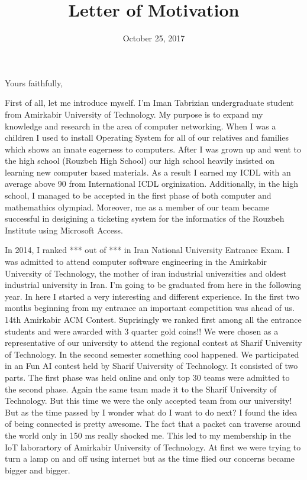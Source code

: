 \documentclass[11pt,a4paper,sans]{moderncv}        %
\title{Letter of Motivation}                               %
\begin{document}
\date{October 25, 2017}
\opening{}
\closing{Yours faithfully,}

\makelettertitle

First of all, let me introduce myself. I'm Iman Tabrizian undergraduate student
from Amirkabir University of Technology. My purpose is to expand my knowledge
and research in the area of computer networking. When I was a children I used
to install Operating System for all of our relatives and families which shows
an innate eagerness to computers. After I was grown up and went to the high school
(Rouzbeh High School) our high school heavily insisted on learning new
computer based materials. As a result I earned my ICDL with an average above 90
from International ICDL orginization. Additionally, in the high school, I
managed to be accepted in the first phase of both computer and mathemathics
olympiad. Moreover, me as a member of our team became successful in desigining
a ticketing system for the informatics of the Rouzbeh Institute using Microsoft
Access.

In 2014, I ranked *** out of *** in Iran National University Entrance Exam. I
was admitted to attend computer software engineering in the Amirkabir University
of Technology, the mother of iran industrial universities and oldest industrial
university in Iran. I'm going to be graduated from here in the following year.
In here I started a very interesting and different experience. In the
first two months beginning from my entrance an important competition was ahead
of us. 14th Amirkabir ACM Contest. Suprisingly we ranked first among all the
entrance students and were awarded with 3 quarter gold coins!! We were chosen
as a representative of our university to attend the regional contest at
Sharif University of Technology. In the second semester something cool
happened. We participated in an Fun AI contest held by Sharif University of Technology.
It consisted of two parts. The first phase was held online and only top 30 teams
were admitted to the second phase. Again the same team made it to the Sharif
University of Technology. But this time we were the only accepted team from
our university! But as the time passed by I wonder what do I want to do next?
I found the idea of being connected is pretty awesome. The fact that
a packet can traverse around the world only in 150 ms really shocked me. This
led to my membership in the IoT laborartory of Amirkabir University of Technology.
At first we were trying to turn a lamp on and off using internet but as the time
flied our concerns became bigger and bigger.
\makeletterclosing
\end{document}
